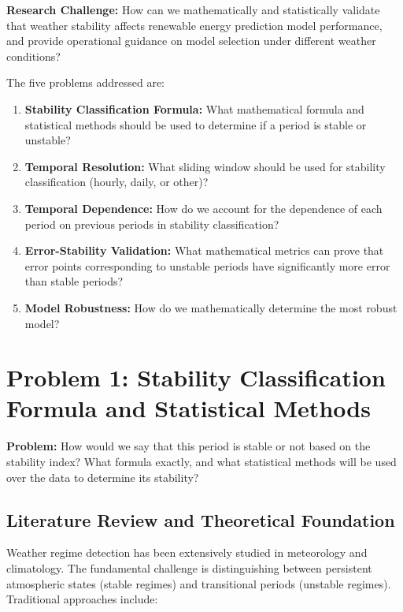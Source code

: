 \documentclass[11pt,a4paper]{article}
\begin{document}
\begin{problembox}
\textbf{Research Challenge:} How can we mathematically and statistically validate that weather stability affects renewable energy prediction model performance, and provide operational guidance on model selection under different weather conditions?
\end{problembox}

The five problems addressed are:
\begin{enumerate}
    \item \textbf{Stability Classification Formula:} What mathematical formula and statistical methods should be used to determine if a period is stable or unstable?
    \item \textbf{Temporal Resolution:} What sliding window should be used for stability classification (hourly, daily, or other)?
    \item \textbf{Temporal Dependence:} How do we account for the dependence of each period on previous periods in stability classification?
    \item \textbf{Error-Stability Validation:} What mathematical metrics can prove that error points corresponding to unstable periods have significantly more error than stable periods?
    \item \textbf{Model Robustness:} How do we mathematically determine the most robust model?
\end{enumerate}

\section{Problem 1: Stability Classification Formula and Statistical Methods}

\begin{problembox}
\textbf{Problem:} How would we say that this period is stable or not based on the stability index? What formula exactly, and what statistical methods will be used over the data to determine its stability?
\end{problembox}

\subsection{Literature Review and Theoretical Foundation}

Weather regime detection has been extensively studied in meteorology and climatology. The fundamental challenge is distinguishing between persistent atmospheric states (stable regimes) and transitional periods (unstable regimes). Traditional approaches include:
\end{document}
